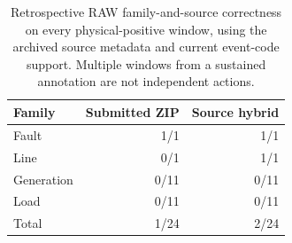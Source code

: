 \begin{table}[t]\centering
\caption{Retrospective RAW family-and-source correctness on every physical-positive window, using the archived source metadata and current event-code support. Multiple windows from a sustained annotation are not independent actions.}
\label{tab:raw-source-hybrid}
\small\setlength{\tabcolsep}{5pt}
\begin{tabular}{lrr}\hline
Family & Submitted ZIP & Source hybrid\\\hline
Fault & 1/1 & 1/1 \\
Line & 0/1 & 1/1 \\
Generation & 0/11 & 0/11 \\
Load & 0/11 & 0/11 \\
Total & 1/24 & 2/24 \\
\hline\end{tabular}
\end{table}
